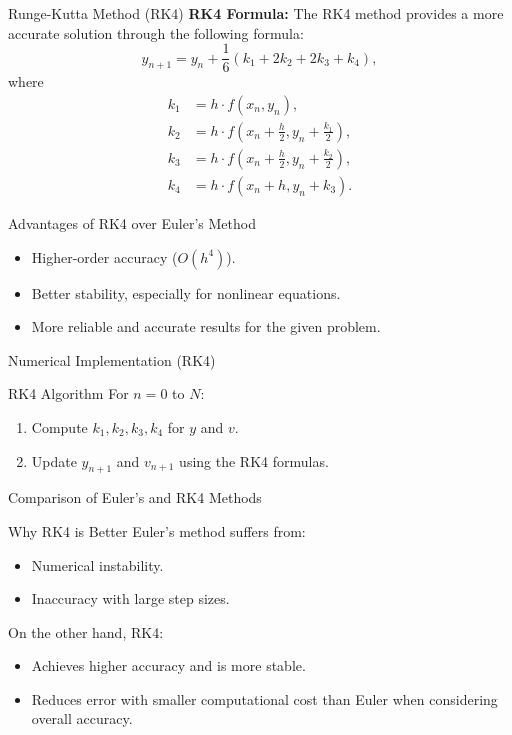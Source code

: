 \documentclass{beamer}
\begin{document}
\begin{frame}[t]{Runge-Kutta Method (RK4)}
\textbf{RK4 Formula:}
The RK4 method provides a more accurate solution through the following formula:
\[
y_{n+1} = y_n + \frac{1}{6}(k_1 + 2k_2 + 2k_3 + k_4),
\]
where
\begin{align*}
    k_1 &= h \cdot f(x_n, y_n), \\
    k_2 &= h \cdot f\left(x_n + \frac{h}{2}, y_n + \frac{k_1}{2}\right), \\
    k_3 &= h \cdot f\left(x_n + \frac{h}{2}, y_n + \frac{k_2}{2}\right), \\
    k_4 &= h \cdot f(x_n + h, y_n + k_3).
\end{align*}

\begin{block}{Advantages of RK4 over Euler's Method}
\begin{itemize}
    \item Higher-order accuracy (\(O(h^4)\)).
    \item Better stability, especially for nonlinear equations.
    \item More reliable and accurate results for the given problem.
\end{itemize}
\end{block}
\end{frame}

\begin{frame}{Numerical Implementation (RK4)}
\begin{block}{RK4 Algorithm}
For \(n = 0\) to \(N\):
\begin{enumerate}
    \item Compute \(k_1, k_2, k_3, k_4\) for \(y\) and \(v\).
    \item Update \(y_{n+1}\) and \(v_{n+1}\) using the RK4 formulas.
\end{enumerate}
\end{block}
\end{frame}

\begin{frame}{Comparison of Euler's and RK4 Methods}
\begin{block}{Why RK4 is Better}
Euler’s method suffers from:
\begin{itemize}
    \item Numerical instability.
    \item Inaccuracy with large step sizes.
\end{itemize}

On the other hand, RK4:
\begin{itemize}
    \item Achieves higher accuracy and is more stable.
    \item Reduces error with smaller computational cost than Euler when considering overall accuracy.
\end{itemize}
\end{block}
\end{frame}
\end{document}
